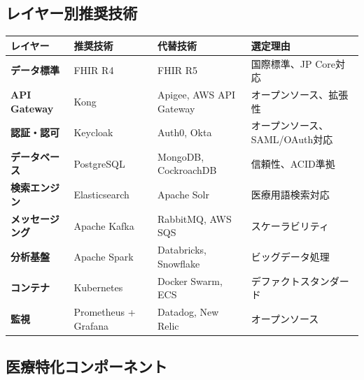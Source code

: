 \documentclass[
  a4paper,
  a4paper,
  11pt]{ltjsbook}
\begin{document}
\subsection{レイヤー別推奨技術}\label{ux30ecux30a4ux30e4ux30fcux5225ux63a8ux5968ux6280ux8853}

\begin{longtable}[]{@{}
  >{\raggedright\arraybackslash}p{}
  >{\raggedright\arraybackslash}p{}
  >{\raggedright\arraybackslash}p{}
  >{\raggedright\arraybackslash}p{}@{}}
\toprule\noalign{}
\begin{minipage}[b]{\linewidth}\raggedright
レイヤー
\end{minipage} & \begin{minipage}[b]{\linewidth}\raggedright
推奨技術
\end{minipage} & \begin{minipage}[b]{\linewidth}\raggedright
代替技術
\end{minipage} & \begin{minipage}[b]{\linewidth}\raggedright
選定理由
\end{minipage} \\
\midrule\noalign{}
\endhead
\bottomrule\noalign{}
\endlastfoot
\textbf{データ標準} & FHIR R4 & FHIR R5 & 国際標準、JP Core対応 \\
\textbf{API Gateway} & Kong & Apigee, AWS API Gateway &
オープンソース、拡張性 \\
\textbf{認証・認可} & Keycloak & Auth0, Okta &
オープンソース、SAML/OAuth対応 \\
\textbf{データベース} & PostgreSQL & MongoDB, CockroachDB &
信頼性、ACID準拠 \\
\textbf{検索エンジン} & Elasticsearch & Apache Solr &
医療用語検索対応 \\
\textbf{メッセージング} & Apache Kafka & RabbitMQ, AWS SQS &
スケーラビリティ \\
\textbf{分析基盤} & Apache Spark & Databricks, Snowflake &
ビッグデータ処理 \\
\textbf{コンテナ} & Kubernetes & Docker Swarm, ECS &
デファクトスタンダード \\
\textbf{監視} & Prometheus + Grafana & Datadog, New Relic &
オープンソース \\
\end{longtable}

\subsection{医療特化コンポーネント}\label{ux533bux7642ux7279ux5316ux30b3ux30f3ux30ddux30fcux30cdux30f3ux30c8}
\end{document}
